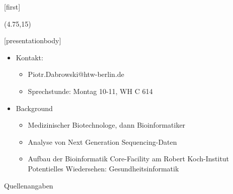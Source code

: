 \documentclass[aspectratio=169,t]{beamer}
\subtitle{1: Allgemeines}
\begin{document}
[first]

\begin{frame}[noframenumbering]
    \titlepage
    \begin{textblock}{10}(4.75,15)
        \cite{logo}
    \end{textblock}
\end{frame}

[presentationbody] 

\begin{frame}[Vorstellung]
	\begin{itemize}
		\item Kontakt:
		\begin{itemize}
			\item Piotr.Dabrowski@htw-berlin.de
			\item Sprechstunde: Montag 10-11, WH C 614
		\end{itemize}
		\item Background
		\begin{itemize}
			\item Medizinischer Biotechnologe, dann Bioinformatiker
			\item Analyse von Next Generation Sequencing-Daten
			\item Aufbau der Bioinformatik Core-Facility am Robert Koch-Institut
			\itme Potentielles Wiedersehen: Gesundheitsinformatik
		\end{itemize}
	\end{itemize}
\end{frame}

\begin{frame}[allowframebreaks]{Quellenangaben}
    \printbibliography
\end{frame}


\end{document}
